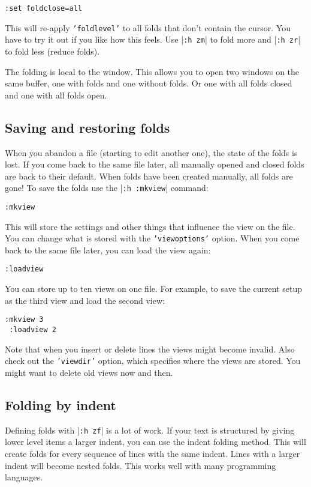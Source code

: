 \begin{Verbatim}[samepage=true]
 :set foldclose=all
\end{Verbatim}

This will re-apply \texttt{'foldlevel'} to all folds that don't contain the cursor.
You have to try it out if you like how this feels.
Use |\texttt{:h zm}| to fold more and |\texttt{:h zr}| to fold less (reduce folds).

The folding is local to the window.
This allows you to open two windows on the same buffer, one with folds and one without folds.
Or one with all folds closed and one with all folds open.
\subsection{Saving and restoring folds}
When you abandon a file (starting to edit another one), the state of the folds is lost.
If you come back to the same file later, all manually opened and closed folds are back to their default.
When folds have been created manually, all folds are gone!  To save the folds use the |\texttt{:h :mkview}| command:

\begin{Verbatim}[samepage=true]
 :mkview
\end{Verbatim}

This will store the settings and other things that influence the view on the file.
You can change what is stored with the \texttt{'viewoptions'} option.
When you come back to the same file later, you can load the view again:

\begin{Verbatim}[samepage=true]
 :loadview
\end{Verbatim}

You can store up to ten views on one file.
For example, to save the current setup as the third view and load the second view:

\begin{Verbatim}[samepage=true]
 :mkview 3
 :loadview 2
\end{Verbatim}

Note that when you insert or delete lines the views might become invalid.
Also check out the \texttt{'viewdir'} option, which specifies where the views are stored.
You might want to delete old views now and then.
\subsection{Folding by indent}
Defining folds with |\texttt{:h zf}| is a lot of work.
If your text is structured by giving lower level items a larger indent, you can use the indent folding method.
This will create folds for every sequence of lines with the same indent.
Lines with a larger indent will become nested folds.
This works well with many programming languages.


